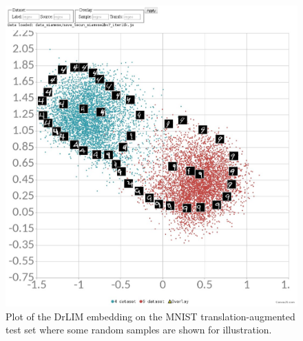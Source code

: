 \documentclass[a4paper,12pt]{report}
\begin{document}
\begin{figure}[h]
    \centering
    \includegraphics{thesis_figures/mnist_cl_drlim.jpg}
    \caption{Plot of the DrLIM embedding on the MNIST translation-augmented test set where some random samples are shown for illustration.}
    \label{fig:mnist_cl_drlim}
\end{figure}
\end{document}
